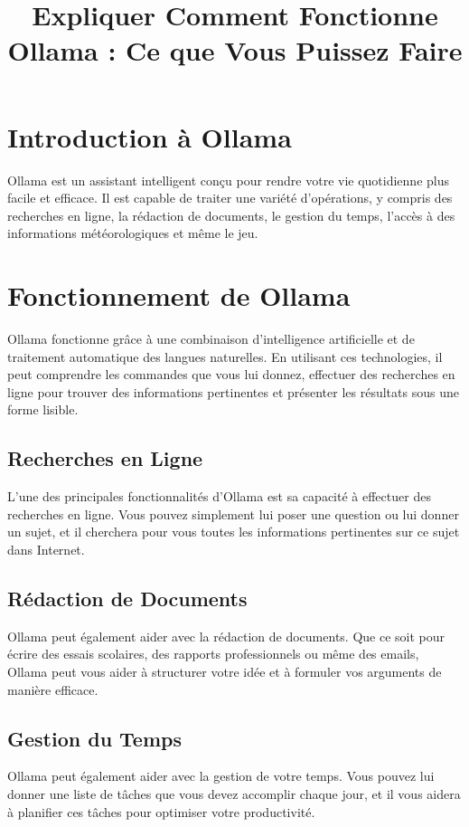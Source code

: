 \documentclass[12pt]{article}
\title{\textbf{Expliquer Comment Fonctionne Ollama : Ce que Vous Puissez Faire}}
\author{}
\date{}
\begin{document}
\maketitle

\section*{Introduction à Ollama}
Ollama est un assistant intelligent conçu pour rendre votre vie quotidienne plus facile et efficace. Il est capable de traiter une variété d'opérations, y compris des recherches en ligne, la rédaction de documents, le gestion du temps, l'accès à des informations météorologiques et même le jeu.

\section*{Fonctionnement de Ollama}

Ollama fonctionne grâce à une combinaison d'intelligence artificielle et de traitement automatique des langues naturelles. En utilisant ces technologies, il peut comprendre les commandes que vous lui donnez, effectuer des recherches en ligne pour trouver des informations pertinentes et présenter les résultats sous une forme lisible.

\subsection*{Recherches en Ligne}
L'une des principales fonctionnalités d'Ollama est sa capacité à effectuer des recherches en ligne. Vous pouvez simplement lui poser une question ou lui donner un sujet, et il cherchera pour vous toutes les informations pertinentes sur ce sujet dans Internet.

\subsection*{Rédaction de Documents}
Ollama peut également aider avec la rédaction de documents. Que ce soit pour écrire des essais scolaires, des rapports professionnels ou même des emails, Ollama peut vous aider à structurer votre idée et à formuler vos arguments de manière efficace.

\subsection*{Gestion du Temps}
Ollama peut également aider avec la gestion de votre temps. Vous pouvez lui donner une liste de tâches que vous devez accomplir chaque jour, et il vous aidera à planifier ces tâches pour optimiser votre productivité.
\end{document}
